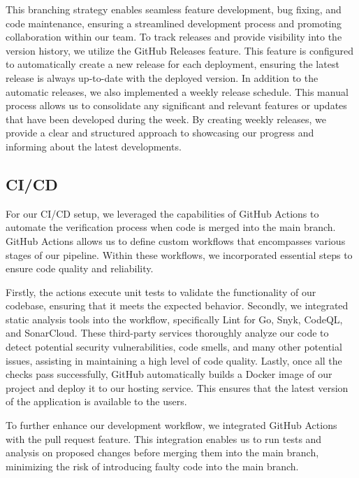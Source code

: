 This branching strategy enables seamless feature development, bug fixing, and code maintenance, ensuring a streamlined development process and promoting collaboration within our team. %
To track releases and provide visibility into the version history, we utilize the GitHub Releases feature. This feature is configured to automatically create a new release for each deployment, ensuring the latest release is always up-to-date with the deployed version. In addition to the automatic releases, we also implemented a weekly release schedule. This manual process allows us to consolidate any significant and relevant features or updates that have been developed during the week. By creating weekly releases, we provide a clear and structured approach to showcasing our progress and informing about the latest developments.


\subsection{CI/CD} \label{sec:cicd}

For our CI/CD setup, we leveraged the capabilities of GitHub Actions to automate the verification process when code is merged into the main branch. GitHub Actions allows us to define custom workflows that encompasses various stages of our pipeline. Within these workflows, we incorporated essential steps to ensure code quality and reliability.

Firstly, the actions execute unit tests to validate the functionality of our codebase, ensuring that it meets the expected behavior. Secondly, we integrated static analysis tools into the workflow, specifically Lint for Go, Snyk, CodeQL, and SonarCloud. These third-party services thoroughly analyze our code to detect potential security vulnerabilities, code smells, and many other potential issues, assisting in maintaining a high level of code quality. 
Lastly, once all the checks pass successfully, GitHub automatically builds a Docker image of our project and deploy it to our hosting service. This ensures that the latest version of the application is available to the users.

To further enhance our development workflow, we integrated GitHub Actions with the pull request feature. This integration enables us to run tests and analysis on proposed changes before merging them into the main branch, minimizing the risk of introducing faulty code into the main branch.

